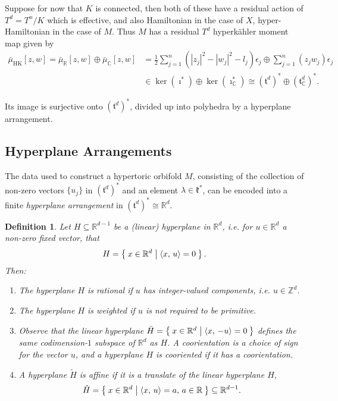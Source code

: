 \documentclass{article}
\newtheorem{defn}[theorem]{Definition\rm}
\newcommand{\ie}{\emph{i.e.} }
\newcommand{\e}{\epsilon}
\newcommand{\RR}{\mathbb{R}}
\newcommand{\CC}{\mathbb{C}}
\newcommand{\ZZ}{\mathbb{Z}}
\newcommand{\mfk}{\mathfrak{k}}
\newcommand{\mft}{\mathfrak{t}}
\newcommand{\half}{\frac{1}{2}}
\newcommand{\bmu}{\bar{\mu}}
\DeclareMathOperator{\HK}{HK}
\begin{document}
	Suppose for now that $K$ is connected, then both of these have a residual action of $T^{d} = T^{n}/K$ which is effective, and also Hamiltonian in the case of $X$, hyper-Hamiltonian in the case of $M$. Thus $M$ has a residual $T^{d}$ hyperk\"ahler moment map given by
	\begin{align}
		\bmu_{\HK}[z,w] = \bmu_{\RR}[z,w] \oplus \bmu_{\CC}[z,w] &= \half \sum_{j=1}^{n}(|z_{j}|^{2} - |w_{j}|^{2} - l_{j})\e_{j} \oplus \sum_{j=1}^{n}(z_{j}w_{j})\e_{j} \\
		&\in \ker(\imath^{\ast}) \oplus \ker(\imath_{\CC}^{\ast}) \cong (\mft^{d})^{\ast} \oplus (\mft_{\CC}^{d})^{\ast}.
	\end{align}

	Its image is surjective onto $(\mft^{d})^{\ast}$, divided up into polyhedra by a hyperplane arrangement.

	\subsection{Hyperplane Arrangements}
	
	The data used to construct a hypertoric orbifold $M$, consisting of the collection of non-zero vectors $\{u_{j}\}$ in $(\mft^{d})^{\ast}$ and an element $\lambda \in \mfk^{\ast}$, can be encoded into a finite \emph{hyperplane arrangement} in $(\mft^{d})^{\ast} \cong \RR^{d}$. 
	
	\begin{defn}
		Let $H \subseteq \RR^{d-1}$ be a (linear) hyperplane in $\RR^{d}$, \ie for $u \in \RR^{d}$ a non-zero fixed vector, that
		\[
			H = \Set{x \in \RR^{d} | \langle x,\, u \rangle = 0 }.
		\]
		Then:
		\begin{enumerate}
			\item[(rational) --] The hyperplane $H$ is \emph{rational} if $u$ has integer-valued components, \ie $u \in \ZZ^{d}$.
			\item[(weighted) --] The hyperplane $H$ is \emph{weighted} if $u$ is not required to be primitive.
			\item[(cooriented) --] Observe that the linear hyperplane $\bar{H} = \Set{ x \in \RR^{d} | \langle x,\, -u \rangle = 0}$ defines the same codimension-$1$ subspace of $\RR^{d}$ as $H$.  A \emph{coorientation} is a choice of sign for the vector $u$, and a hyperplane $H$ is \emph{cooriented} if it has a coorientation.
			\item[(affine) --] A hyperplane $\tilde{H}$ is \emph{affine} if it is a translate of the linear hyperplane $H$,
			\[
				\tilde{H} = \Set{x \in \RR^{d} | \langle x,\, u \rangle = a,\, a \in \RR} \subseteq \RR^{d-1}.	
			\]
		\end{enumerate}
	\end{defn}
\end{document}
